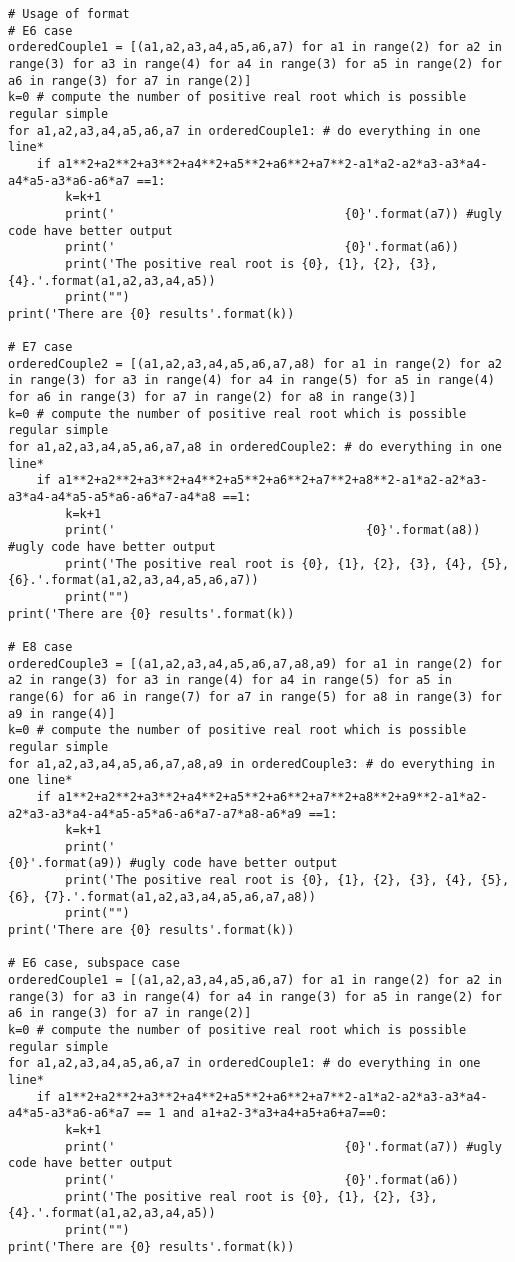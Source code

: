 \documentclass[11pt]{amsart}
\begin{document}
\begin{lstlisting}[language=iPython]
# Usage of format
# E6 case
orderedCouple1 = [(a1,a2,a3,a4,a5,a6,a7) for a1 in range(2) for a2 in range(3) for a3 in range(4) for a4 in range(3) for a5 in range(2) for a6 in range(3) for a7 in range(2)] 
k=0 # compute the number of positive real root which is possible regular simple
for a1,a2,a3,a4,a5,a6,a7 in orderedCouple1: # do everything in one line*
    if a1**2+a2**2+a3**2+a4**2+a5**2+a6**2+a7**2-a1*a2-a2*a3-a3*a4-a4*a5-a3*a6-a6*a7 ==1:
        k=k+1
        print('                                {0}'.format(a7)) #ugly code have better output
        print('                                {0}'.format(a6))
        print('The positive real root is {0}, {1}, {2}, {3}, {4}.'.format(a1,a2,a3,a4,a5))
        print("")
print('There are {0} results'.format(k))

# E7 case
orderedCouple2 = [(a1,a2,a3,a4,a5,a6,a7,a8) for a1 in range(2) for a2 in range(3) for a3 in range(4) for a4 in range(5) for a5 in range(4) for a6 in range(3) for a7 in range(2) for a8 in range(3)] 
k=0 # compute the number of positive real root which is possible regular simple
for a1,a2,a3,a4,a5,a6,a7,a8 in orderedCouple2: # do everything in one line*
    if a1**2+a2**2+a3**2+a4**2+a5**2+a6**2+a7**2+a8**2-a1*a2-a2*a3-a3*a4-a4*a5-a5*a6-a6*a7-a4*a8 ==1:
        k=k+1
        print('                                   {0}'.format(a8)) #ugly code have better output
        print('The positive real root is {0}, {1}, {2}, {3}, {4}, {5}, {6}.'.format(a1,a2,a3,a4,a5,a6,a7))
        print("")
print('There are {0} results'.format(k))

# E8 case
orderedCouple3 = [(a1,a2,a3,a4,a5,a6,a7,a8,a9) for a1 in range(2) for a2 in range(3) for a3 in range(4) for a4 in range(5) for a5 in range(6) for a6 in range(7) for a7 in range(5) for a8 in range(3) for a9 in range(4)] 
k=0 # compute the number of positive real root which is possible regular simple
for a1,a2,a3,a4,a5,a6,a7,a8,a9 in orderedCouple3: # do everything in one line*
    if a1**2+a2**2+a3**2+a4**2+a5**2+a6**2+a7**2+a8**2+a9**2-a1*a2-a2*a3-a3*a4-a4*a5-a5*a6-a6*a7-a7*a8-a6*a9 ==1:
        k=k+1
        print('                                         {0}'.format(a9)) #ugly code have better output
        print('The positive real root is {0}, {1}, {2}, {3}, {4}, {5}, {6}, {7}.'.format(a1,a2,a3,a4,a5,a6,a7,a8))
        print("")
print('There are {0} results'.format(k))

# E6 case, subspace case
orderedCouple1 = [(a1,a2,a3,a4,a5,a6,a7) for a1 in range(2) for a2 in range(3) for a3 in range(4) for a4 in range(3) for a5 in range(2) for a6 in range(3) for a7 in range(2)] 
k=0 # compute the number of positive real root which is possible regular simple
for a1,a2,a3,a4,a5,a6,a7 in orderedCouple1: # do everything in one line*
    if a1**2+a2**2+a3**2+a4**2+a5**2+a6**2+a7**2-a1*a2-a2*a3-a3*a4-a4*a5-a3*a6-a6*a7 == 1 and a1+a2-3*a3+a4+a5+a6+a7==0:
        k=k+1
        print('                                {0}'.format(a7)) #ugly code have better output
        print('                                {0}'.format(a6))
        print('The positive real root is {0}, {1}, {2}, {3}, {4}.'.format(a1,a2,a3,a4,a5))
        print("")
print('There are {0} results'.format(k))


\end{lstlisting}
\end{document}
